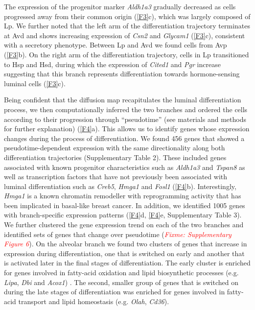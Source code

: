 \documentclass[titlepage, 12pt, oneside]{amsart}
\newcommand{\fixme}[1]{\textit{\textcolor{red}{Fixme: #1}}}
\begin{document}
The expression of the progenitor marker \textit{Aldh1a3} gradually decreased as cells progressed away from their common origin (\autoref{F3}c), which was largely composed of Lp.
We further noted that the left arm of the differentiation trajectory terminates at Avd and shows increasing expression of \textit{Csn2} and \textit{Glycam1} (\autoref{F3}c), consistent with a secretory phenotype.
Between Lp and Avd we found cells from Avp (\autoref{F3}b).
On the right arm of the differentiation trajectory, cells in Lp transitioned to Hsp and Hsd, during which the expression of \textit{Cited1} and \textit{Pgr} increase suggesting that this branch represents differentiation towards hormone-sensing luminal cells (\autoref{F3}c).

Being confident that the diffusion map recapitulates the luminal differentiation process, we then computationally inferred the two branches and ordered the cells according to their progression through ``pseudotime''\autocite{Haghverdi2016} (see materials and methods for further explanation) (\autoref{F4}a).
This allows us to identify genes whose expression changes during the process of differentiation.
We found 456 genes that showed a pseudotime-dependent expression with the same directionality along both differentiation trajectories (Supplementary Table 2).
These included genes associated with known progenitor characteristics such as \textit{Aldh1a3} and \textit{Tspan8} as well as transcription factors that have not previously been associated with luminal differentiation such as \textit{Creb5}, \textit{Hmga1} and \textit{Fosl1} (\autoref{F4}b).
Interestingly, \textit{Hmga1} is a known chromatin remodeller with reprogramming activity that has been implicated in basal-like breast cancer\autocite{Shah2012,Shah2013}.
In addition, we identified 1005 genes with branch-specific expression patterns (\autoref{F4}d, \autoref{F4}e, Supplementary Table 3).
We further clustered the gene expression trend on each of the two branches and identified sets of genes that change over pseudotime (\fixme{Supplementary Figure 6}).
On the alveolar branch we found two clusters of genes that increase in expression during differentiation, one that is switched on early and another that is activated later in the final stages of differentiation.
The early cluster is enriched for genes involved in fatty-acid oxidation and lipid biosynthetic processes (e.g. \textit{Lipa}, \textit{Dbi} and \textit{Acox1}) .
The second, smaller group of genes that is switched on during the late stages of differentiation was enriched for genes involved in fatty-acid transport and lipid homeostasis (e.g. \textit{Olah}, \textit{Cd36}).
\end{document}

